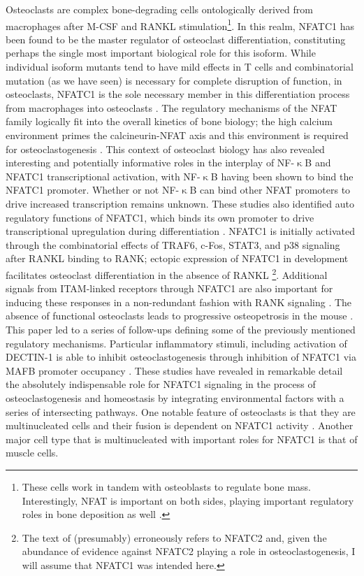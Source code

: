 Osteoclasts are complex bone\hyp{}degrading cells ontologically derived from macrophages after M\hyp{}CSF and RANKL stimulation\footnote{These cells work in tandem with osteoblasts to regulate bone mass. Interestingly, NFAT is important on both sides, playing important regulatory roles in bone deposition as well \citep{Winslow2006}.}. In this realm, NFATC1 has been found to be the master regulator of osteoclast differentiation, constituting perhaps the single most important biological role for this isoform. While individual isoform mutants tend to have mild effects in T cells and combinatorial mutation (as we have seen) is necessary for complete disruption of function, in osteoclasts, NFATC1 is the sole necessary member in this differentiation process from macrophages into osteoclasts \citep{Kim2014}. The regulatory mechanisms of the NFAT family logically fit into the overall kinetics of bone biology; the high calcium environment primes the calcineurin\hyp{}NFAT axis and this environment is required for osteoclastogenesis \citep{NegishiKoga2009}. This context of osteoclast biology has also revealed interesting and potentially informative roles in the interplay of NF\hyp{}$\upkappa$B and NFATC1 transcriptional activation, with NF\hyp{}$\upkappa$B having been shown to bind the NFATC1 promoter. Whether or not NF\hyp{}$\upkappa$B can bind other NFAT promoters to drive increased transcription remains unknown. These studies also identified auto regulatory functions of NFATC1, which binds its own promoter to drive transcriptional upregulation during differentiation \citep{Asagiri2005}. NFATC1 is initially activated through the combinatorial effects of TRAF6, c\hyp{}Fos, STAT3, and p38 signaling after RANKL binding to RANK; ectopic expression of NFATC1 in development facilitates osteoclast differentiation in the absence of RANKL \citep{Takayanagi2002, Huang2006, Yang2019, Matsumoto2004, Huang2020}\footnote{The text of \citep{Huang2020} (presumably) erroneously refers to NFATC2 and, given the abundance of evidence against NFATC2 playing a role in osteoclastogenesis, I will assume that NFATC1 was intended here.}. Additional signals from ITAM\hyp{}linked receptors through NFATC1 are also important for inducing these responses in a non\hyp{}redundant fashion with RANK signaling \citep{Koga2004}. The absence of functional osteoclasts leads to progressive osteopetrosis in the mouse \citep{Takayanagi2002, Kim2014}. This paper led to a series of follow\hyp{}ups defining some of the previously mentioned regulatory mechanisms. Particular inflammatory stimuli, including activation of DECTIN\hyp{}1 is able to inhibit osteoclastogenesis through inhibition of NFATC1 via MAFB promoter occupancy \citep{Zhu2017}. These studies have revealed in remarkable detail the absolutely indispensable role for NFATC1 signaling in the process of osteoclastogenesis and homeostasis by integrating environmental factors with a series of intersecting pathways. One notable feature of osteoclasts is that they are multinucleated cells and their fusion is dependent on NFATC1 activity \citep{Kim2008}. Another major cell type that is multinucleated with important roles for NFATC1 is that of muscle cells. 

